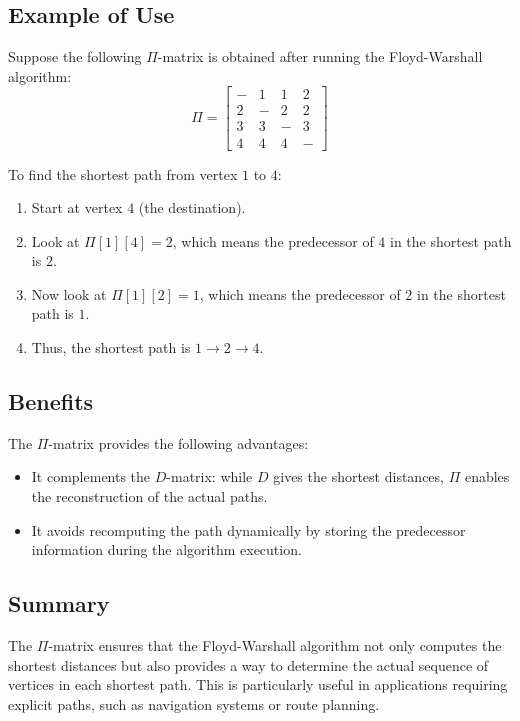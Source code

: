 \subsection{Example of Use}
Suppose the following \( \Pi \)-matrix is obtained after running the Floyd-Warshall algorithm:
\[
\Pi = 
\begin{bmatrix}
- & 1 & 1 & 2 \\
2 & - & 2 & 2 \\
3 & 3 & - & 3 \\
4 & 4 & 4 & -
\end{bmatrix}
\]

To find the shortest path from vertex \( 1 \) to \( 4 \):
\begin{enumerate}
    \item Start at vertex \( 4 \) (the destination).
    \item Look at \( \Pi[1][4] = 2 \), which means the predecessor of \( 4 \) in the shortest path is \( 2 \).
    \item Now look at \( \Pi[1][2] = 1 \), which means the predecessor of \( 2 \) in the shortest path is \( 1 \).
    \item Thus, the shortest path is \( 1 \to 2 \to 4 \).
\end{enumerate}

\subsection{Benefits}
The \( \Pi \)-matrix provides the following advantages:
\begin{itemize}
    \item It complements the \( D \)-matrix: while \( D \) gives the shortest distances, \( \Pi \) enables the reconstruction of the actual paths.
    \item It avoids recomputing the path dynamically by storing the predecessor information during the algorithm execution.
\end{itemize}

\subsection{Summary}
The \( \Pi \)-matrix ensures that the Floyd-Warshall algorithm not only computes the shortest distances but also provides a way to determine the actual sequence of vertices in each shortest path. This is particularly useful in applications requiring explicit paths, such as navigation systems or route planning.


